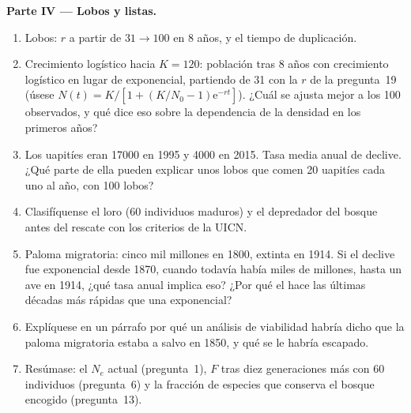 \begin{problem}
\medskip
\noindent\textbf{Parte IV --- Lobos y listas.}
\begin{enumerate}[resume]
  \item Lobos: $r$ a partir de $31 \to 100$ en 8 años, y el tiempo de
        duplicación.
  \item Crecimiento logístico hacia $K = 120$: población tras 8 años con
        crecimiento logístico en lugar de exponencial, partiendo de 31
        con la $r$ de la pregunta~19 (úsese $N(t) = K/[1 + (K/N_{0} -
        1)\mathrm{e}^{-rt}]$). ¿Cuál se ajusta mejor a los 100
        observados, y qué dice eso sobre la dependencia de la densidad
        en los primeros años?
  \item Los uapitíes eran \num{17000} en 1995 y \num{4000} en 2015.
        Tasa media anual de declive. ¿Qué parte de ella pueden explicar
        unos lobos que comen \num{20} uapitíes cada uno al año, con 100
        lobos?
  \item Clasifíquense el loro (60 individuos maduros) y el depredador
        del bosque antes del rescate con los criterios de la UICN.
  \item Paloma migratoria: cinco mil millones en 1800, extinta en 1914.
        Si el declive fue exponencial desde 1870, cuando todavía había
        miles de millones, hasta un ave en 1914, ¿qué tasa anual implica
        eso? ¿Por qué el  hace las últimas décadas más
        rápidas que una exponencial?
  \item Explíquese en un párrafo por qué un análisis de viabilidad
        habría dicho que la paloma migratoria estaba a salvo en 1850, y
        qué se le habría escapado.
  \item Resúmase: el $N_{e}$ actual (pregunta~1), $F$ tras diez
        generaciones más con 60 individuos (pregunta~6) y la fracción de
        especies que conserva el bosque encogido (pregunta~13).
\end{enumerate}
\end{problem}
